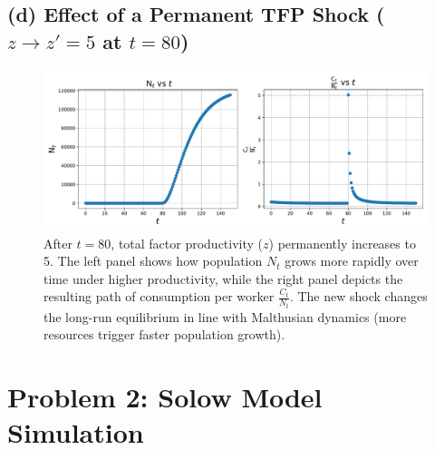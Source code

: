 \documentclass[12pt]{article}
\begin{document}
\subsection*{(d) Effect of a Permanent TFP Shock ($z \to z'=5$ at $t=80$)}
\begin{figure}[H]
    \centering
    \includegraphics[width=1\textwidth]{1(d).pdf}
    \caption{After $t=80$, total factor productivity ($z$) permanently increases to 5. 
    The left panel shows how population $N_t$ grows more rapidly over time 
    under higher productivity, while the right panel depicts the resulting path 
    of consumption per worker $\tfrac{C_t}{N_t}$. 
    The new shock changes the long-run equilibrium in line with 
    Malthusian dynamics (more resources trigger faster population growth).}
    \label{fig:1(d)}
\end{figure}


\section*{Problem 2: Solow Model Simulation}
\end{document}
